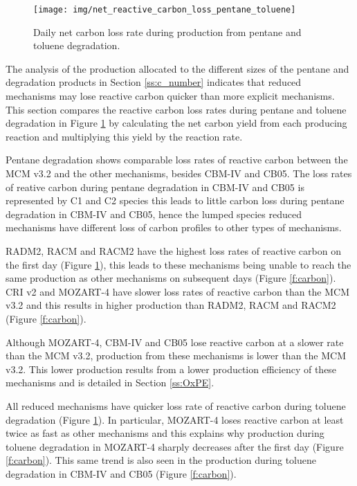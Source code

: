 \begin{figure}
    \centering
    \texttt{[image: img/net\_reactive\_carbon\_loss\_pentane\_toluene]}
    \vspace{0mm}
    \caption{Daily net carbon loss rate during  production from pentane and toluene degradation.}
    \vspace{-4mm}
    \label{f:net_carbon_loss}
\end{figure}

The analysis of the  production allocated to the different sizes of the pentane and degradation products in Section \ref{ss:c_number} indicates that reduced mechanisms may lose reactive carbon quicker than more explicit mechanisms.
This section compares the reactive carbon loss rates during pentane and toluene degradation in Figure \ref{f:net_carbon_loss} by calculating the net carbon yield from each  producing reaction and multiplying this yield by the reaction rate.

Pentane degradation shows comparable loss rates of reactive carbon between the MCM v3.2 and the other mechanisms, besides CBM-IV and CB05.
The loss rates of reative carbon during pentane degradation in CBM-IV and CB05 is represented by C1 and C2 species this leads to little carbon loss during pentane degradation in CBM-IV and CB05, hence the lumped species reduced mechanisms have different loss of carbon profiles to other types of mechanisms.

RADM2, RACM and RACM2 have the highest loss rates of reactive carbon on the first day (Figure \ref{f:net_carbon_loss}), this leads to these mechanisms being unable to reach the same  production as other mechanisms on subsequent days (Figure \ref{f:carbon}).
CRI v2 and MOZART-4 have slower loss rates of reactive carbon than the MCM v3.2 and this results in higher  production than RADM2, RACM and RACM2 (Figure \ref{f:carbon}).

Although MOZART-4, CBM-IV and CB05 lose reactive carbon at a slower rate than the MCM v3.2,  production from these mechanisms is lower than the MCM v3.2.
This lower  production results from a lower  production efficiency of these mechanisms and is detailed in Section \ref{ss:OxPE}.

All reduced mechanisms have quicker loss rate of reactive carbon during toluene degradation (Figure \ref{f:net_carbon_loss}).
In particular, MOZART-4 loses reactive carbon at least twice as fast as other mechanisms and this explains why  production during toluene degradation in MOZART-4 sharply decreases after the first day (Figure \ref{f:carbon}).
This same trend is also seen in the  production during toluene degradation in CBM-IV and CB05 (Figure \ref{f:carbon}).

